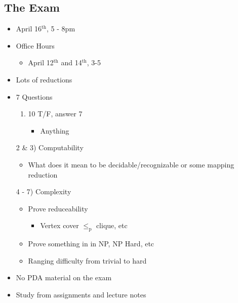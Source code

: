 \documentclass[11pt]{article}
\begin{document}
\subsection{The Exam}
\label{sec:orgf48b917}
\begin{itemize}
\item April 16\(^{\text{th}}\), 5 - 8pm
\item Office Hours
\begin{itemize}
\item April 12\(^{\text{th}}\) and 14\(^{\text{th}}\), 3-5
\end{itemize}
\item Lots of reductions
\item 7 Questions
\begin{enumerate}
\item 10 T/F, answer 7
\begin{itemize}
\item Anything
\end{itemize}
\end{enumerate}
2 \& 3) Computability
\begin{itemize}
\item What does it mean to be decidable/recognizable or some mapping reduction
\end{itemize}
4 - 7) Complexity
\begin{itemize}
\item Prove reduceability
\begin{itemize}
\item Vertex cover \(\le_{\text{p}}\) clique, etc
\end{itemize}
\item Prove something in in NP, NP Hard, etc
\item Ranging difficulty from trivial to hard
\end{itemize}
\end{itemize}
\begin{itemize}
\item No PDA material on the exam
\item Study from assignments and lecture notes
\end{itemize}
\end{document}
